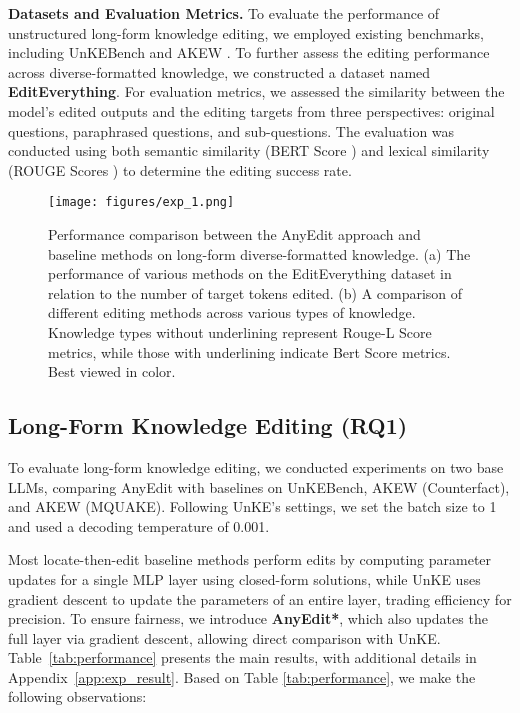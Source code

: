 \textbf{Datasets and Evaluation Metrics.}  
To evaluate the performance of unstructured long-form knowledge editing, we employed existing benchmarks, including UnKEBench \cite{UnKE} and AKEW \cite{AKEW}. To further assess the editing performance across diverse-formatted knowledge, we constructed a dataset named \textbf{EditEverything}. For evaluation metrics, we assessed the similarity between the model's edited outputs and the editing targets from three perspectives: original questions, paraphrased questions, and sub-questions. The evaluation was conducted using both semantic similarity (BERT Score \cite{bertscore}) and lexical similarity (ROUGE Scores \cite{rouge}) to determine the editing success rate.

\begin{figure*}[t]
    \centering
    \texttt{[image: figures/exp\_1.png]}
    \caption{Performance comparison between the AnyEdit approach and baseline methods on long-form diverse-formatted knowledge. (a) The performance of various methods on the EditEverything dataset in relation to the number of target tokens edited. (b) A comparison of different editing methods across various types of knowledge. Knowledge types without underlining represent Rouge-L Score metrics, while those with underlining indicate Bert Score metrics. Best viewed in color.}
    \label{fig:exp_1}
\end{figure*}

\subsection{Long-Form Knowledge Editing (RQ1)}  
To evaluate long-form knowledge editing, we conducted experiments on two base LLMs, comparing AnyEdit with baselines on UnKEBench, AKEW (Counterfact), and AKEW (MQUAKE). Following UnKE’s settings, we set the batch size to 1 and used a decoding temperature of 0.001.

Most locate-then-edit baseline methods perform edits by computing parameter updates for a single MLP layer using closed-form solutions, while UnKE uses gradient descent to update the parameters of an entire layer, trading efficiency for precision. To ensure fairness, we introduce \textbf{AnyEdit*}, which also updates the full layer via gradient descent, allowing direct comparison with UnKE. Table~\ref{tab:performance} presents the main results, with additional details in Appendix~\ref{app:exp_result}. Based on Table \ref{tab:performance}, we make the following observations:

